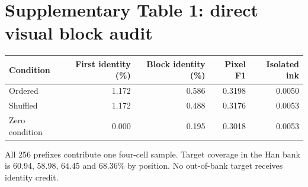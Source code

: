 \section*{Supplementary Table 1: direct visual block audit}
\begin{center}\begin{tabular}{lrrrr}\toprule
Condition & First identity (\%) & Block identity (\%) & Pixel F1 & Isolated ink \\
\midrule
Ordered & 1.172 & 0.586 & 0.3198 & 0.0050 \\
Shuffled & 1.172 & 0.488 & 0.3176 & 0.0053 \\
Zero condition & 0.000 & 0.195 & 0.3018 & 0.0053 \\
\bottomrule\end{tabular}\end{center}
All 256 prefixes contribute one four-cell sample. Target coverage in the Han bank is 60.94, 58.98, 64.45 and 68.36\% by position. No out-of-bank target receives identity credit.
